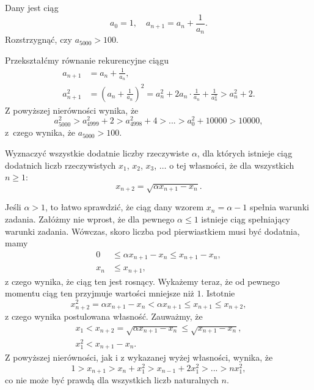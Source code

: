 \vspace{5px}

\begin{problem}{5}
	Dany jest ciąg
	\[
		a_0 = 1, \quad a_{n + 1} = a_n + \frac{1}{a_n}.
	\]
	Rozstrzygnąć, czy $a_{5000} > 100$.
\end{problem}


\noindent
Przekształćmy równanie rekurencyjne ciągu
\begin{align*}
	a_{n + 1} &= a_n + \frac{1}{a_n}, \\
	a_{n + 1}^2 &= \left(a_n + \frac{1}{a_n}\right)^2 = a_n^2 + 2 a_n \cdot \frac{1}{a_n} + \frac{1}{a_n^2}  > a_n^2 + 2.
\end{align*}
Z powyższej nierówności wynika, że
\[
	a_{5000}^2 > a_{4999}^2 + 2 > a_{4998}^2 + 4 > ... > a_0^2 + 10000 > 10000, 
\]
z~czego wynika, że $a_{5000} > 100$.

\vspace{5px}

\begin{problem}{6}
	Wyznaczyć wszystkie dodatnie liczby rzeczywiste $\alpha$, dla których istnieje ciąg dodatnich liczb rzeczywistych $x_1$, $x_2$, $x_3$, $\dots$ o tej własności, że dla wszystkich $n\geqslant 1$:
	\[
		x_{n+2} = \sqrt{\alpha x_{n+1} - x_n}.
	\]
\end{problem}


\noindent
Jeśli $\alpha > 1$, to łatwo sprawdzić, że ciąg dany wzorem $x_n  = \alpha - 1$ spełnia warunki zadania. Załóżmy nie wprost, że dla pewnego $\alpha \leqslant 1$ istnieje ciąg spełniający warunki zadania. Wówczas, skoro liczba pod pierwiastkiem musi być dodatnia, mamy
\begin{align*}
 	0 &\leqslant \alpha x_{n+1} - x_n \leqslant x_{n + 1} - x_n, \\
 	x_n &\leqslant x_{n + 1},
\end{align*}
z czego wynika, że ciąg ten jest rosnący. Wykażemy teraz, że od pewnego momentu ciąg ten przyjmuje wartości mniejsze niż $1$. Istotnie
\[
	x_{n + 2}^2 = \alpha x_{n + 1} - x_n < \alpha x_{n + 1} \leqslant x_{n + 1} \leqslant x_{n + 2},
\]
z czego wynika postulowana własność.
Zauważmy, że
\begin{align*}
	x_1 < x_{n + 2} = \sqrt{\alpha x_{n+1} - x_n} \leqslant \sqrt{x_{n+1} - x_n}, \\
	x_1^2 < x_{n+1} - x_n.
\end{align*}
Z powyższej nierówności, jak i z wykazanej wyżej własności, wynika, że
\[
	1 > x_{n + 1} > x_n + x_{1}^2 > x_{n - 1} + 2x_{1}^2 > ... > nx_{1}^2,
\]
co nie może być prawdą dla wszystkich liczb naturalnych $n$.


